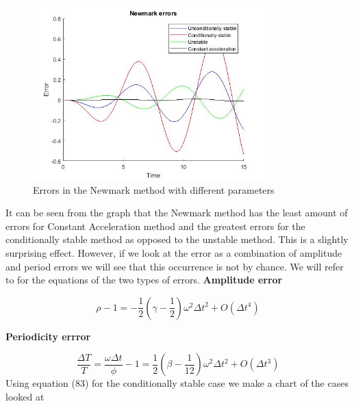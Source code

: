 \documentclass{article}
\begin{document}
				\begin{figure}[h!]
   					 \centering
   					 \includegraphics[width=90mm]{untitled.jpg}
   					 \caption{Errors in the Newmark method with different parameters}
				            \label{fig17}
  				\end{figure}
It can be seen from the graph that the Newmark method has the least amount of errors for Constant Acceleration method and the greatest errors for the conditionally stable method as opposed to the unstable method. This is a slightly surprising effect. However, if we look at the error as a combination of amplitude and period errors we will see that this occurrence is not by chance. We will refer to \cite{Gerardin} for the equations of the two types of errors.
\newline
\textbf{Amplitude error}
				
				\begin{equation*}
					\rho - 1 = -\frac{1}{2}\left( \gamma - \frac{1}{2} \right)\omega^2\Delta t^2 + O(\Delta t^4)
				\end{equation*}

\textbf{Periodicity errror}

				\begin{equation*}
					\frac{\Delta T}{T} =\frac{\omega \Delta t}{\phi} - 1 = \frac{1}{2}\left( \beta - \frac{1}{12} \right)\omega^2\Delta t^2 + O(\Delta t^3)
				\end{equation*}
Using equation (83) for the conditionally stable case we make a chart of the cases looked at
\end{document}
